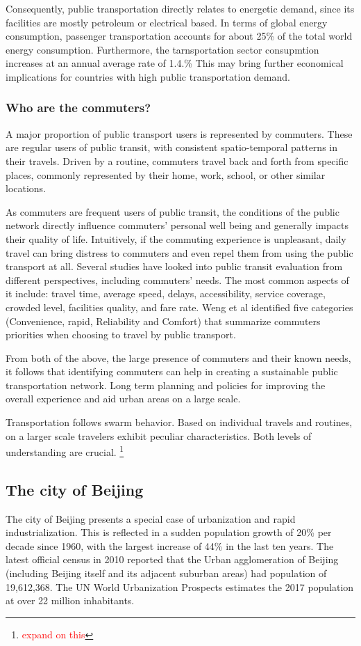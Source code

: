 \documentclass{article}
\newcommand{\selfnote}[1]{\footnote{\textcolor{red}{#1}}}
\begin{document}
Consequently, public transportation directly relates to energetic demand, since its facilities are mostly petroleum or electrical based. In terms of global energy consumption, passenger transportation accounts for about 25\% of the total world energy consumption. Furthermore, the tarnsportation sector consupmtion increases at an annual average rate of 1.4.\% \cite{eia2016energy} This may bring further economical implications for countries with high public transportation demand.

\subsubsection{Who are the commuters?}
A major proportion of public transport users is represented by commuters. These are regular users of public transit, with consistent spatio-temporal patterns in their travels. Driven by a routine, commuters travel back and forth from specific places, commonly represented by their home, work, school, or other similar locations.

As commuters are frequent users of public transit, the  conditions of the public network directly influence commuters' personal well being and generally impacts their quality of life. Intuitively, if the commuting experience is unpleasant, daily travel can bring distress to commuters and even repel them from using the public transport at all. Several studies have looked into public transit evaluation from different perspectives, including commuters' needs. The most common aspects of it include: travel time, average speed, delays, accessibility, service coverage, crowded level, facilities quality, and fare rate. Weng et al \cite{weng2013bus} identified five categories (Convenience, rapid, Reliability and Comfort) that summarize commuters priorities when choosing to travel by public transport.
 
From both of the above, the large presence of commuters and their known needs, it follows that identifying commuters can help in creating a sustainable public transportation network. Long term planning and policies for improving the overall experience and aid urban areas on a large scale.

Transportation follows swarm behavior. Based on individual travels and routines, on a larger scale travelers exhibit peculiar characteristics. Both levels of understanding are crucial.  \selfnote{expand on this} 

\subsection{The city of Beijing}
The city of Beijing presents a special case of urbanization and rapid industrialization. This is reflected in a sudden population growth of 20\% per decade since 1960, with the largest increase of 44\% in the last ten years. The latest official census in 2010 reported that the Urban agglomeration of Beijing (including Beijing itself and its adjacent suburban areas) had population of 19,612,368. The UN World Urbanization Prospects estimates the 2017 population at over 22 million inhabitants. \cite{world2016beijing}
\end{document}
